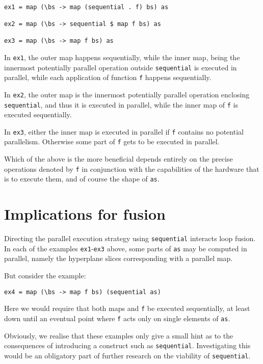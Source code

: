 \begin{verbatim}

ex1 = map (\bs -> map (sequential . f) bs) as

ex2 = map (\bs -> sequential $ map f bs) as

ex3 = map (\bs -> map f bs) as

\end{verbatim}

In \texttt{ex1}, the outer map happens sequentially, while the inner map, being
the innermost potentially parallel operation outside \texttt{sequential} is
executed in parallel, while each application of function \texttt{f} happens
sequentially.

In \texttt{ex2}, the outer map is the innermost potentially parallel operation
enclosing \texttt{sequential}, and thus it is executed in parallel, while the
inner map of \texttt{f} is executed sequentially.

In \texttt{ex3}, either the inner map is executed in parallel if \texttt{f}
contains no potential parallelism. Otherwise some part of \texttt{f} gets to be
executed in parallel.

Which of the above is the more beneficial depends entirely on the precise
operations denoted by \texttt{f} in conjunction with the capabilities of the
hardware that is to execute them, and of course the shape of \texttt{as}.

\section{Implications for fusion}

Directing the parallel execution strategy using \texttt{sequential} interacts
loop fusion.  In each of the examples \texttt{ex1}-\texttt{ex3} above, some
parts of \texttt{as} may be computed in parallel, namely the hyperplane slices
corresponding with a parallel map.

But consider the example:
\begin{verbatim}
ex4 = map (\bs -> map f bs) (sequential as)
\end{verbatim}

Here we would require that both maps and \texttt{f} be executed sequentially,
at least down until an eventual point where \texttt{f} acts only on single
elements of \texttt{as}.

Obviously, we realise that these examples only give a small hint as to the
consequences of introducing a construct such as \texttt{sequential}.
Investigating this would be an obligatory part of further research on the
viability of \texttt{sequential}.

